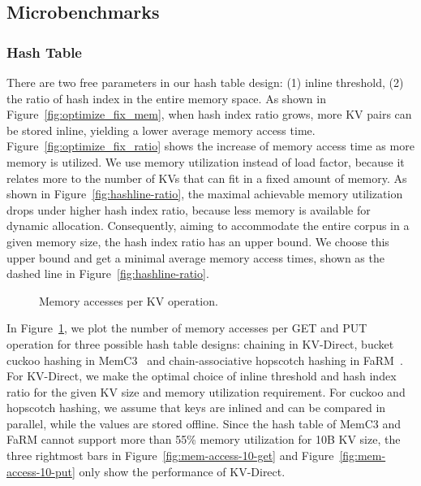 \subsection{Microbenchmarks}
\label{sec:microbenchmarks}


\subsubsection{Hash Table}
\label{sec:hashtable-eval}

There are two free parameters in our hash table design: (1) inline threshold, (2) the ratio of hash index in the entire memory space.
As shown in Figure~\ref{fig:optimize_fix_mem}, when hash index ratio grows, more KV pairs can be stored inline, yielding a lower average memory access time.
Figure~\ref{fig:optimize_fix_ratio} shows the increase of memory access time as more memory is utilized.
We use memory utilization instead of load factor, because it relates more to the number of KVs that can fit in a fixed amount of memory.
As shown in Figure~\ref{fig:hashline-ratio}, the maximal achievable memory utilization drops under higher hash index ratio, because less memory is available for dynamic allocation.
Consequently, aiming to accommodate the entire corpus in a given memory size, the hash index ratio has an upper bound.
We choose this upper bound and get a minimal average memory access times, shown as the dashed line in Figure~\ref{fig:hashline-ratio}.

\begin{figure}[t]
\centering
{}

\vfill

\caption{Memory accesses per KV operation.}
\label{fig:mem-access-tput}
\vspace{-10pt}
\end{figure}

In Figure~\ref{fig:mem-access-tput}, we plot the number of memory accesses per GET and PUT operation for three possible hash table designs: chaining in KV-Direct, bucket cuckoo hashing in MemC3~\cite{fan2013memc3} and chain-associative hopscotch hashing in FaRM~\cite{dragojevic2014farm}.
For KV-Direct, we make the optimal choice of inline threshold and hash index ratio for the given KV size and memory utilization requirement.
For cuckoo and hopscotch hashing, we assume that keys are inlined and can be compared in parallel, while the values are stored offline.
Since the hash table of MemC3 and FaRM cannot support more than 55\% memory utilization for 10B KV size, the three rightmost bars in Figure~\ref{fig:mem-access-10-get} and Figure~\ref{fig:mem-access-10-put} only show the performance of KV-Direct.

